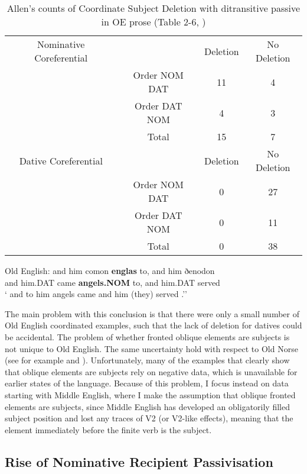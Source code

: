 	\begin{table}[t]
		\begin{tabular}{cccc}
			Nominative Coreferential & & Deletion & No Deletion \\
			& Order NOM DAT & 11 & 4 \\
			& Order DAT NOM & 4 & 3 \\
			& Total & 15 & 7 \\
			\hline
			Dative Coreferential & & Deletion & No Deletion \\
			& Order NOM DAT & 0 & 27 \\
			& Order DAT NOM & 0 & 11 \\
			& Total & 0 & 38 \\
		\end{tabular}
		\caption{Allen's counts of Coordinate Subject Deletion with ditransitive passive in OE prose (Table 2-6, \citealt{Allen.1999})}
		\label{tab:AllenOECSD}
	\end{table}

	\begin{exe}
		\ex \label{ex:OECSD} Old English:
		\gll and him comon \textbf{englas} to, and him ðenodon\\
		and him.DAT came \textbf{angels.NOM} to, and him.DAT served\\
		\trans ` and to him angels came and him (they) served \citep[ex. 34]{Allen.1999}.''
	\end{exe}

	The main problem with this conclusion is that there were only a small number of Old English coordinated examples, such that the lack of deletion for datives could be accidental. The problem of whether fronted oblique elements are subjects is not unique to Old English. The same uncertainty hold with respect to Old Norse (see for example \citealt{Kristoffersen.1991,Kristoffersen.1994} and \citealt{Bardal.2001b}). Unfortunately, many of the examples that clearly show that oblique elements are subjects rely on negative data, which is unavailable for earlier states of the language. Because of this problem, I focus instead on data starting with Middle English, where I make the assumption that oblique fronted elements are subjects, since Middle English has developed an obligatorily filled subject position and lost any traces of V2 (or V2-like effects), meaning that the element immediately before the finite verb is the subject.

	\subsection{Rise of Nominative Recipient Passivisation}


